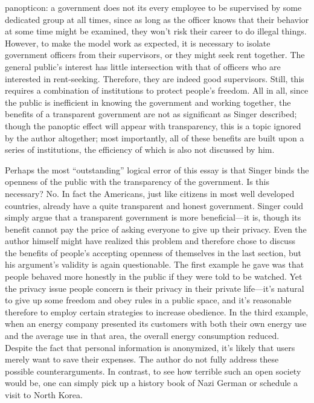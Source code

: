 \documentclass{writing}
\begin{document}
panopticon: a government does not its every employee to be supervised by
some dedicated group at all times, since as long as the officer knows
that their behavior at some time might be examined, they won't risk
their career to do illegal things. However, to make the model work as
expected, it is necessary to isolate government officers from their
supervisors, or they might seek rent together. The general public's
interest has little intersection with that of officers who are
interested in rent-seeking. Therefore, they are indeed good supervisors.
Still, this requires a combination of institutions to protect people's
freedom. All in all, since the public is inefficient in knowing the
government and working together, the benefits of a transparent
government are not as significant as Singer described; though the
panoptic effect will appear with transparency, this is a topic ignored
by the author altogether; most importantly, all of these benefits are
built upon a series of institutions, the efficiency of which is also not
discussed by him.

Perhaps the most ``outstanding'' logical error of this essay is that
Singer binds the openness of the public with the transparency of the
government. Is this necessary? No. In fact the Americans, just like
citizens in most well developed countries, already have a quite
transparent and honest government. Singer could simply argue that a
transparent government is more beneficial---it is, though its benefit
cannot pay the price of asking everyone to give up their privacy. Even
the author himself might have realized this problem and therefore chose
to discuss the benefits of people's accepting openness of themselves in
the last section, but his argument's validity is again questionable. The
first example he gave was that people behaved more honestly in the
public if they were told to be watched. Yet the privacy issue people
concern is their privacy in their private life---it's natural to give up
some freedom and obey rules in a public space, and it's reasonable
therefore to employ certain strategies to increase obedience. In the
third example, when an energy company presented its customers with both
their own energy use and the average use in that area, the overall
energy consumption reduced. Despite the fact that personal information
is anonymized, it's likely that users merely want to save their
expenses. The author do not fully address these possible
counterarguments. In contrast, to see how terrible such an open society
would be, one can simply pick up a history book of Nazi German or
schedule a visit to North Korea.
\end{document}
